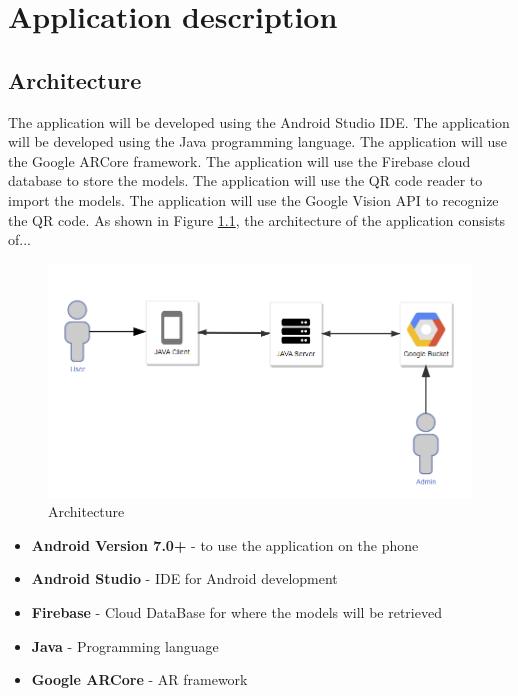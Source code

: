 \chapter{Application description}\label{chapter:appdescription}

\section{Architecture}
The application will be developed using the Android Studio IDE.
The application will be developed using the Java programming language.
The application will use the Google ARCore framework\cite{ARCore}.
The application will use the Firebase cloud database to store the models. The application will use the \ac{QR} code reader to import the models.
The application will use the Google Vision API to recognize the \ac{QR} code.
As shown in Figure \ref{fig:architecture}, the architecture of the application consists of...

\begin{figure}[ht]
    \centering
    \includegraphics[width=1\textwidth]{img/architecture.png}
    \caption{Architecture}
    \label{fig:architecture}
\end{figure}

\begin{itemize}
    \item \textbf{Android Version 7.0+} - to use the application on the phone
    \item \textbf{Android Studio} - IDE for Android development
    \item \textbf{Firebase} - Cloud DataBase for where the models will be retrieved
    \item \textbf{Java} - Programming language
    \item \textbf{Google ARCore} - \ac{AR} framework
\end{itemize}

